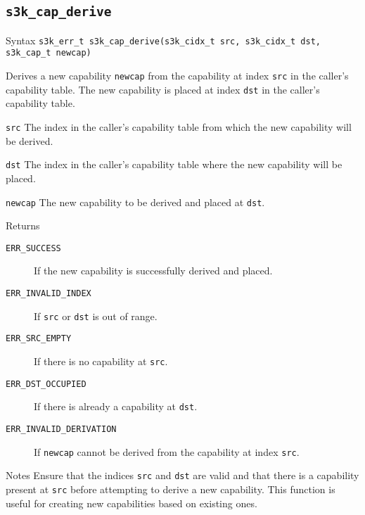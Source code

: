 \documentclass[a4paper,11pt]{article}
\newcommand{\syscall}[1]{\texttt{#1}}
\newenvironment{syscalldoc}[1]{
  \subsection{\syscall{#1}} %
  \begin{tcolorbox}
  \begin{description}[leftmargin=!,style=nextline,noitemsep]
}{
  \end{description}
  \end{tcolorbox}
}
\begin{document}
\begin{syscalldoc}{s3k\_cap\_derive}
  \item[Syntax] \lstinline{s3k_err_t s3k_cap_derive(s3k_cidx_t src, s3k_cidx_t dst, s3k_cap_t newcap)}
  \item[Description]
	  Derives a new capability \verb|newcap| from the capability at index \verb|src| in the caller's capability table. The new capability is placed at index \verb|dst| in the caller's capability table.

  \item[Parameters]
    \begin{description}
      \item[]
      \item[\texttt{src}] The index in the caller's capability table from which the new capability will be derived.
      \item[\texttt{dst}] The index in the caller's capability table where the new capability will be placed.
      \item[\texttt{newcap}] The new capability to be derived and placed at \verb|dst|.
    \end{description}

  \item[Returns]
    \begin{description}
      \item[]
      \item[\texttt{ERR\_SUCCESS}] If the new capability is successfully derived and placed.
      \item[\texttt{ERR\_INVALID\_INDEX}] If \verb|src| or \verb|dst| is out of range.
      \item[\texttt{ERR\_SRC\_EMPTY}] If there is no capability at \verb|src|.
      \item[\texttt{ERR\_DST\_OCCUPIED}] If there is already a capability at \verb|dst|.
      \item[\texttt{ERR\_INVALID\_DERIVATION}] If \verb|newcap| cannot be derived from the capability at index \verb|src|.
    \end{description}

  \item[Notes]
	  Ensure that the indices \verb|src| and \verb|dst| are valid and that there is a capability present at \verb|src| before attempting to derive a new capability. This function is useful for creating new capabilities based on existing ones.
\end{syscalldoc}
\end{document}
